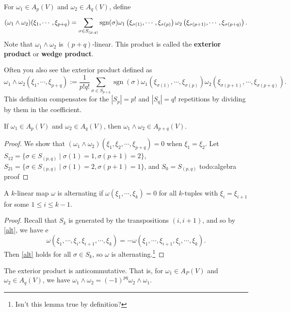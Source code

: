 \begin{definition}[]
    For $\omega_1\in A_p(V)$ and $\omega_2 \in A_q(V)$, define \[
        (\omega_1\wedge\omega_2)(\xi_1,\cdots ,\xi_{p+q})=\sum_{\sigma \in S_{(p,q)}}^{} \operatorname{sgn}(\sigma)\omega_1 \left( \xi_{\sigma(1)}, \cdots  , \xi_{\sigma(p)} \right) \omega_2\left( \xi_{\sigma(p+1)}, \cdots ,\xi_{\sigma(p+q)} \right) .
    \] 
    Note that $\omega_1\wedge \omega_2$ is $(p+q)$-linear. This product is called the \textbf{exterior product} or \textbf{wedge product}.
\end{definition}
\begin{remark}
    Often you also see the exterior product defined as \[
        \omega_1\wedge \omega_2(\xi_1,\cdots ,\xi_{p+q}):=\frac{1}{p!q!}\sum _{\sigma \in S_{p+q}}\operatorname{sgn}(\sigma)\omega_1(\xi_{\sigma(1)},\cdots ,\xi_{\sigma(p)})\omega_2(\xi_{\sigma(p+1)},\cdots ,\xi_{\sigma(p+q)}).
    \] This definition compensates for the $|S_p|=p!$ and $|S_q|=q!$ repetitions by dividing by them in the coefficient.
\end{remark}
\begin{lemma}
    If $\omega_1 \in A_p(V)$ and $\omega_2 \in A_q(V)$, then $\omega_1\wedge \omega_2 \in A_{p+q}(V)$.
\end{lemma}
\begin{proof}
    We show that $(\omega_1\wedge\omega_2)(\xi_1,\xi_2, \cdots ,\xi_{p+q})=0$ when $\xi_1=\xi_2$. Let $S_{12}=\{\sigma \in S_{(p,q)}\mid \sigma(1)=1,\sigma(p+1)=2\} $, $S_{21}=\{\sigma\in S_{(p,q)}\mid \sigma(1)=2,\sigma(p+1)=1\} $, and $S_0=S_{(p,q)}$ {\color{red}todo:algebra proof} 
\end{proof}
\begin{lemma}\label{transp} 
    A $k$-linear map $\omega$ is alternating if $\omega(\xi_1,\cdots ,\xi_k)=0$ for all $k$-tuples with $\xi_i =\xi_{i+1}$ for some $1\leq i \leq k-1$.
\end{lemma}
\begin{proof}
    Recall that $S_k$ is generated by the transpositions $(i,i+1)$, and so by \cref{alt}, we have e \[
        \omega(\xi_1,\cdots ,\xi_i ,\xi_{i+1},\cdots ,\xi_k)=-\omega(\xi_1,\cdots ,\xi_{i+1},\xi_i ,\cdots ,\xi_k).
    \] Then \cref{alt} holds for all $\sigma \in S_k$, so $\omega$ is alternating.\footnote{Isn't this lemma true by definition?}
\end{proof}
\begin{lemma}
    The exterior product is anticommutative. That is, for $\omega_1 \in A_P(V)$ and $\omega_2 \in A_q(V)$, we have  $\omega_1\wedge \omega_2=(-1)^{pq}\omega_2\wedge \omega_1$.
\end{lemma}
